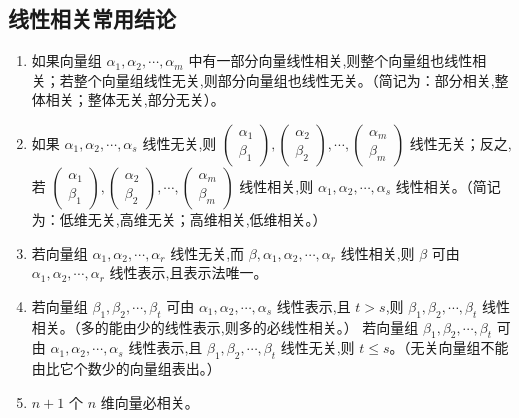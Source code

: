 \documentclass[UTF8]{ctexart}
\theoremstyle{remark}
\begin{document}
	\subsection{线性相关常用结论}
	\begin{enumerate}
		\item 如果向量组 \(\alpha_1,\alpha_2,\cdots,\alpha_m\) 中有一部分向量线性相关,则整个向量组也线性相关；若整个向量组线性无关,则部分向量组也线性无关。（简记为：部分相关,整体相关；整体无关,部分无关）。
		\item 如果 \(\alpha_1,\alpha_2,\cdots,\alpha_s\) 线性无关,则 \(\begin{pmatrix}\alpha_1\\\beta_1\end{pmatrix}, \begin{pmatrix}\alpha_2\\\beta_2\end{pmatrix}, \cdots, \begin{pmatrix}\alpha_m\\\beta_m\end{pmatrix}\) 线性无关；反之,若 \(\begin{pmatrix}\alpha_1\\\beta_1\end{pmatrix}, \begin{pmatrix}\alpha_2\\\beta_2\end{pmatrix}, \cdots, \begin{pmatrix}\alpha_m\\\beta_m\end{pmatrix}\) 线性相关,则 \(\alpha_1,\alpha_2,\cdots,\alpha_s\) 线性相关。（简记为：低维无关,高维无关；高维相关,低维相关。）
		\item 若向量组 \(\alpha_1,\alpha_2,\cdots,\alpha_r\) 线性无关,而 \(\beta,\alpha_1,\alpha_2,\cdots,\alpha_r\) 线性相关,则 \(\beta\) 可由 \(\alpha_1,\alpha_2,\cdots,\alpha_r\) 线性表示,且表示法唯一。
		\item 若向量组 \(\beta_1,\beta_2,\cdots,\beta_t\) 可由 \(\alpha_1,\alpha_2,\cdots,\alpha_s\) 线性表示,且 \(t > s\),则 \(\beta_1,\beta_2,\cdots,\beta_t\) 线性相关。（多的能由少的线性表示,则多的必线性相关。）
		若向量组 \(\beta_1,\beta_2,\cdots,\beta_t\) 可由 \(\alpha_1,\alpha_2,\cdots,\alpha_s\) 线性表示,且 \(\beta_1,\beta_2,\cdots,\beta_t\) 线性无关,则 \(t \leq s\)。（无关向量组不能由比它个数少的向量组表出。）
		\item \(n + 1\) 个 \(n\) 维向量必相关。
	\end{enumerate}
	
\end{document}
